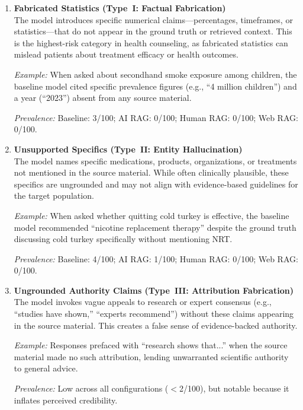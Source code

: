 \begin{enumerate}

\item \textbf{Fabricated Statistics (Type~I: Factual Fabrication)} \\
The model introduces specific numerical claims---percentages, timeframes, or statistics---that do not appear in the ground truth or retrieved context. This is the highest-risk category in health counseling, as fabricated statistics can mislead patients about treatment efficacy or health outcomes.

\textit{Example:} When asked about secondhand smoke exposure among children, the baseline model cited specific prevalence figures (e.g., ``4 million children'') and a year (``2023'') absent from any source material.

\textit{Prevalence:} Baseline: 3/100; AI RAG: 0/100; Human RAG: 0/100; Web RAG: 0/100.

\item \textbf{Unsupported Specifics (Type~II: Entity Hallucination)} \\
The model names specific medications, products, organizations, or treatments not mentioned in the source material. While often clinically plausible, these specifics are ungrounded and may not align with evidence-based guidelines for the target population.

\textit{Example:} When asked whether quitting cold turkey is effective, the baseline model recommended ``nicotine replacement therapy'' despite the ground truth discussing cold turkey specifically without mentioning NRT.

\textit{Prevalence:} Baseline: 4/100; AI RAG: 1/100; Human RAG: 0/100; Web RAG: 0/100.

\item \textbf{Ungrounded Authority Claims (Type~III: Attribution Fabrication)} \\
The model invokes vague appeals to research or expert consensus (e.g., ``studies have shown,'' ``experts recommend'') without these claims appearing in the source material. This creates a false sense of evidence-backed authority.

\textit{Example:} Responses prefaced with ``research shows that...'' when the source material made no such attribution, lending unwarranted scientific authority to general advice.

\textit{Prevalence:} Low across all configurations ($<$2/100), but notable because it inflates perceived credibility.


\end{enumerate}
